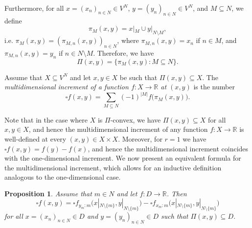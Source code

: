 \documentclass{amsart}
\theoremstyle{plain}%
\newtheorem{proposition}[theorem]{Proposition}
\theoremstyle{definition}
\theoremstyle{remark}
\begin{document}
Furthermore, for all $x=(x_n)_{n\in N}\in V^N$, $y=(y_n)_{n\in N}\in V^N$, and $M\subseteq N$, we define 
\begin{equation*}
\pi_M(x,y)=x|_M\cup y|_{N\setminus M},
\end{equation*}
i.e. $\pi_M(x,y)=(\pi_{M,n}(x,y))_{n\in N}$, where
$\pi_{M,n}(x,y)=x_n$ if $n\in M$, and $\pi_{M,n}(x,y)=y_n$ if $n\in N\setminus M$.
Therefore, we have 
\begin{equation*}
\Pi(x,y)=\{\pi_M(x,y):M\subseteq N\}.
\end{equation*}

Assume that $X\subseteq V^N$ and let $x,y\in X$ be such that $\Pi(x,y)\subseteq X$. The \emph{multidimensional increment of a function $f\colon X\to\mathbb{R}$ at $(x,y)$} is the number	
\begin{equation}\label{equ:defIncrement}
\square f(x,y)=\sum_{M\subseteq N}(-1)^{|M|}f\big(\pi_M(x,y)\big).
\end{equation}

Note that in the case where $X$ is $\Pi$\nobreakdash-convex, we have $\Pi(x,y)\subseteq X$ for all $x,y\in X$, and hence the multidimensional increment of any function $f\colon X\to\mathbb{R}$ is well-defined at every $(x,y)\in X\times X$. 
Moreover, for $r=1$ we have $\square f(x,y)=f(y)-f(x)$, and hence the multidimensional increment coincides with the one-dimensional increment. We now present an equivalent formula for the multidimensional increment, which allows for an inductive definition analogous to the one-dimensional case.

\begin{proposition}\label{prop:indIncrement}
Assume that $m\in N$ and let $f\colon D\to\mathbb{R}$. Then 
\begin{equation*}\label{equ:indIncrement}
\square f(x,y)=\square f_{y_m{:}m}\big(x|_{N\setminus \{m\}},y|_{N\setminus \{m\}}\big)-\square f_{x_m{:}m}\big(x|_{N\setminus \{m\}},y|_{N\setminus \{m\}}\big)
\end{equation*}
for all $x=(x_n)_{n\in N}\in D$ and $y=(y_n)_{n\in N}\in D$ such that $\Pi(x,y)\subseteq D$.
\end{proposition}
\end{document}
